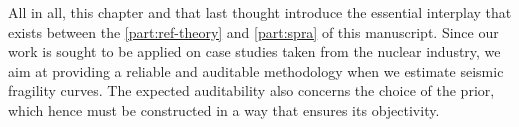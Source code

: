 

All in all, this chapter and that last thought introduce the essential interplay that exists between the \cref{part:ref-theory} and \cref{part:spra} of this manuscript.
Since our work is sought to be applied on case studies taken from the nuclear industry, we aim at providing a reliable and auditable methodology when we estimate seismic fragility curves.
The expected  auditability also concerns the choice of the prior, which hence must be constructed in a way that ensures its objectivity.





\newpage
\thispagestyle{plain}























